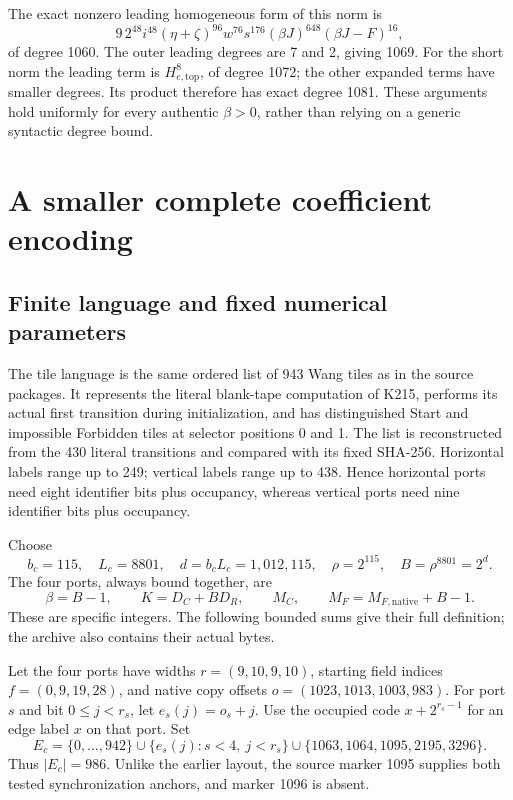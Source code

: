 \documentclass[11pt]{article}
\begin{document}
The exact nonzero leading homogeneous form of this norm is
\[
 9\,2^{48}i^{48}(\eta+\zeta)^{96}w^{76}s^{176}
 (\beta J)^{648}(\beta J-F)^{16},
\]
of degree 1060. The outer leading degrees are 7 and 2, giving 1069.
For the short norm the leading term is $H_{e,\mathrm{top}}^8$, of degree
1072; the other expanded terms have smaller degrees. Its product therefore
has exact degree 1081. These arguments hold uniformly for every authentic
$\beta>0$, rather than relying on a generic syntactic degree bound.

\section{A smaller complete coefficient encoding}\label{sec:coeff}

\subsection{Finite language and fixed numerical parameters}

The tile language is the same ordered list of 943 Wang tiles as in the source
packages. It represents the literal blank-tape computation of K215, performs
its actual first transition during initialization, and has distinguished
Start and impossible Forbidden tiles at selector positions 0 and 1. The
list is reconstructed from the 430 literal transitions and compared with its
fixed SHA-256. Horizontal labels range up to 249; vertical labels range up
to 438. Hence horizontal ports need eight identifier bits plus occupancy,
whereas vertical ports need nine identifier bits plus occupancy.

Choose
\[
 b_c=115,\quad L_c=8801,\quad d=b_cL_c=1,012,115,
 \quad \rho=2^{115},\quad B=\rho^{8801}=2^d.
\]
The four ports, always bound together, are
\begin{equation}\boxed{
 \beta=B-1,\qquad K=D_C+BD_R,\qquad M_C,\qquad
 M_F=M_{F,\mathrm{native}}+B-1.}\label{eq:ports}
\end{equation}
These are specific integers. The following bounded sums give their full
definition; the archive also contains their actual bytes.

Let the four ports have widths $r=(9,10,9,10)$, starting field indices
$f=(0,9,19,28)$, and native copy offsets $o=(1023,1013,1003,983)$.
For port $s$ and bit $0\le j<r_s$, let $e_s(j)=o_s+j$.
Use the occupied code $x+2^{r_s-1}$ for an edge label $x$ on that port.
Set
\[
 E_c=\{0,\ldots,942\}
 \cup\{e_s(j):s<4,\ j<r_s\}
 \cup\{1063,1064,1095,2195,3296\}.
\]
Thus $|E_c|=986$. Unlike the earlier layout, the source marker 1095 supplies
both tested synchronization anchors, and marker 1096 is absent.
\end{document}
